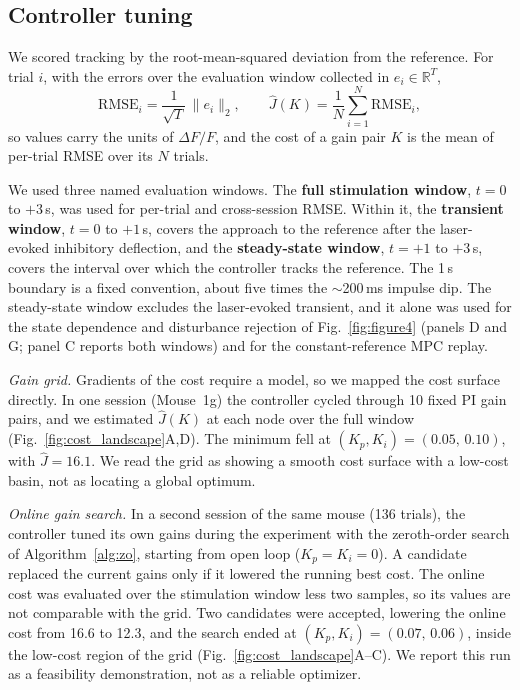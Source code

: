 \subsection*{Controller tuning}
\label{sec:gain_opt}

We scored tracking by the root-mean-squared deviation from the reference. For
trial $i$, with the errors over the evaluation window collected in
$e_{i} \in \mathbb{R}^{T}$,
%
\begin{equation}
    \mathrm{RMSE}_{i} = \frac{1}{\sqrt{T}}\,\lVert e_{i} \rVert_{2},
    \qquad
    \hat{J}(K) = \frac{1}{N}\sum_{i=1}^{N}\mathrm{RMSE}_{i},
    \label{eq:trial_cost}
\end{equation}
%
so values carry the units of $\Delta F/F$, and the cost of a gain pair $K$ is the
mean of per-trial RMSE over its $N$ trials.

We used three named evaluation windows.
The \textbf{full stimulation window}, $t = 0$ to $+3$\,s, was used for per-trial and cross-session RMSE.
Within it, the \textbf{transient window}, $t = 0$ to $+1$\,s, covers the approach to the reference after the laser-evoked inhibitory deflection, and the \textbf{steady-state window}, $t = +1$ to $+3$\,s, covers the interval over which the controller tracks the reference.
The 1\,s boundary is a fixed convention, about five times the $\sim$200\,ms impulse dip.
The steady-state window excludes the laser-evoked transient, and it alone was used for the state dependence and disturbance rejection of Fig.~\ref{fig:figure4} (panels D and G; panel C reports both windows) and for the constant-reference MPC replay.

\emph{Gain grid.} Gradients of the cost require a model, so we mapped the cost
surface directly. In one session (Mouse~1g) the controller cycled
through 10 fixed PI gain pairs, and we estimated $\hat{J}(K)$ at each node over
the full window (Fig.~\ref{fig:cost_landscape}A,D). The minimum fell at
$(K_p, K_i) = (0.05,\,0.10)$, with $\hat{J} = 16.1$. We read the grid as showing
a smooth cost surface with a low-cost basin, not as locating a global optimum.

\emph{Online gain search.} In a second session of the same mouse
(136 trials), the controller tuned its own gains during the
experiment with the zeroth-order search of Algorithm~\ref{alg:zo}, starting from
open loop ($K_p = K_i = 0$). A candidate replaced the current gains only if it
lowered the running best cost. The online cost was evaluated over the
stimulation window less two samples, so its values are not comparable with the
grid. Two candidates were accepted, lowering the online cost from 16.6 to 12.3,
and the search ended at $(K_p, K_i) = (0.07,\,0.06)$, inside the low-cost region
of the grid (Fig.~\ref{fig:cost_landscape}A--C). We report this run as a
feasibility demonstration, not as a reliable optimizer.

